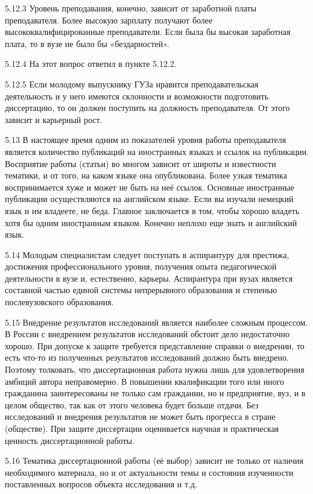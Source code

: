 5.12.3 Уровень преподавания, конечно, зависит от заработной платы преподавателя. Более высокую зарплату получают более высококвалифицированные преподаватели. Если была бы высокая заработная плата, то в вузе не было бы «бездарностей».

5.12.4 На этот вопрос ответил в пункте 5.12.2.

5.12.5 Если молодому выпускнику ГУЗа нравится преподавательская деятельность и у него имеются склонности и возможности подготовить диссертацию, то он должен поступить на должность преподавателя. От этого зависит и карьерный рост.

5.13 В настоящее время одним из показателей уровня работы преподавателя является количество публикаций на иностранных языках и ссылок на публикации. Восприятие работы (статьи) во многом зависит от широты и известности тематики, и от того, на каком языке она опубликована. Более узкая тематика воспринимается хуже и может не быть на неё ссылок. Основные иностранные публикации осуществляются на английском языке. Если вы изучали немецкий язык и им владеете, не беда. Главное заключается в том, чтобы хорошо владеть хотя бы одним иностранным языком. Конечно неплохо еще знать и английский язык.

5.14 Молодым специалистам следует поступать в аспирантуру для престижа, достижения профессионального уровня, получения опыта педагогической деятельности в вузе и, естественно, карьеры. Аспирантура при вузах является составной частью единой системы непрерывного образования и степенью послевузовского образования.

5.15 Внедрение результатов исследований является наиболее сложным процессом. В России с внедрением результатов исследований обстоит дело недостаточно хорошо. При допуске к защите требуется представление справки о внедрении, то есть что-то из полученных результатов исследований должно быть внедрено. Поэтому толковать, что диссертационная работа нужна лишь для удовлетворения амбиций автора неправомерно. В повышении квалификации того или иного гражданина заинтересованы не только сам гражданин, но и предприятие, вуз, и в целом общество, так как от этого человека будет больше отдачи. Без исследований и внедрения результатов не может быть прогресса в стране (обществе). При защите диссертации оценивается научная и практическая ценность диссертационной работы.

5.16 Тематика диссертационной работы (её выбор) зависит не только от наличия необходимого материала, но и от актуальности темы и состояния изученности поставленных вопросов объекта исследования и т.д.

